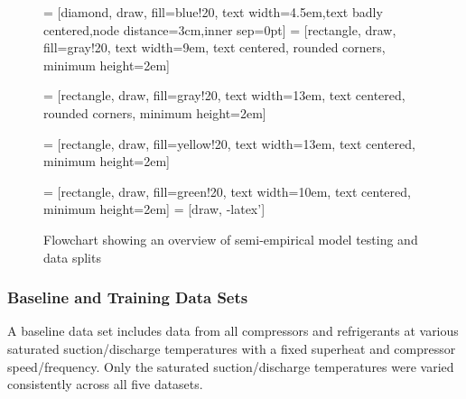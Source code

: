 \documentclass[preprint,11pt,authoryear]{elsarticle}
\begin{document}
\begin{figure}[h] %
\caption{Flowchart showing an overview of semi-empirical model testing and data splits}
 = [diamond, draw, fill=blue!20, text width=4.5em,text badly 									centered,node distance=3cm,inner sep=0pt]
  = [rectangle, draw, fill=gray!20, 
    text width=9em, text centered, rounded corners, minimum height=2em]
    
  = [rectangle, draw, fill=gray!20, 
    text width=13em, text centered, rounded corners, minimum height=2em]
      
  = [rectangle, draw, fill=yellow!20, 
    text width=13em, text centered, minimum height=2em]  
    
  = [rectangle, draw, fill=green!20, 
    text width=10em, text centered, minimum height=2em] 
 = [draw, -latex']

\begin{center}    
\end{center}
\label{fig:data-flowchart}
\end{figure}

\subsubsection{Baseline and Training Data Sets}
A baseline data set includes data from all compressors and refrigerants at various saturated suction/discharge temperatures with a fixed superheat and compressor speed/frequency.  Only the saturated suction/discharge temperatures were varied consistently across all five datasets. 
\end{document}
